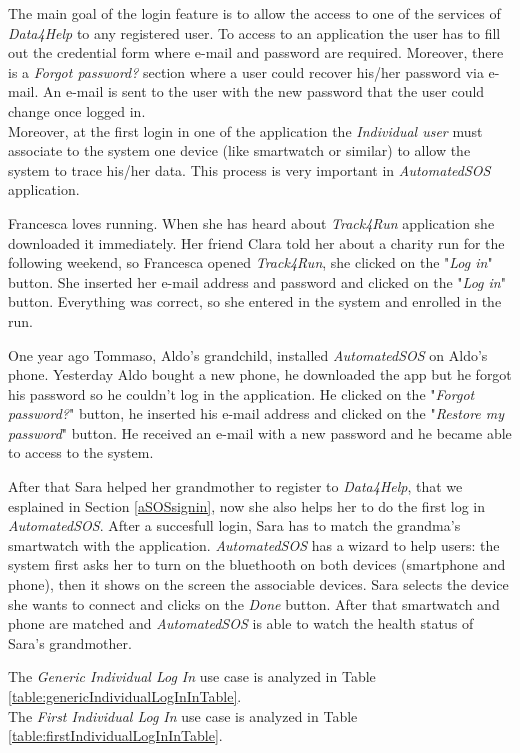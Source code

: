 The main goal of the login feature is to allow the access to one of the services of \textit{Data4Help} to any registered user. To access to an application the user has to fill out the credential form where e-mail and password are required. Moreover, there is a \textit{Forgot password?} section where a user could recover his/her password via e-mail. An e-mail is sent to the user with the new password that the user could change once logged in.\\
Moreover, at the first login in one of the application the \textit{Individual user} must associate to the system one device (like smartwatch or similar) to allow the system to trace his/her data. This process is very important in \textit{AutomatedSOS} application.

Francesca loves running. When she has heard about \textit{Track4Run} application she downloaded it immediately. Her friend Clara told her about a charity run for the following weekend, so Francesca opened \textit{Track4Run}, she clicked on the "\textit{Log in}" button. She inserted her e-mail address and password and clicked on the "\textit{Log in}" button. Everything was correct, so she entered in the system and enrolled in the run.

One year ago Tommaso, Aldo's grandchild, installed \textit{AutomatedSOS} on Aldo’s phone. Yesterday Aldo bought a new phone, he downloaded the app but he forgot his password so he couldn’t log in the application. He clicked on the "\textit{Forgot password?}" button, he inserted his e-mail address and clicked on the  "\textit{Restore my password}" button. He received an e-mail with a new password and he became able to access to the system.

After that Sara helped her grandmother to register to \textit{Data4Help}, that we esplained in Section \ref{aSOSsignin}, now she also helps her to do the first log in \textit{AutomatedSOS}. After a succesfull login, Sara has to match the grandma's smartwatch with the application. \textit{AutomatedSOS} has a wizard to help users: the system first asks her to turn on the bluethooth on both devices (smartphone and phone), then it shows on the screen the associable devices. Sara selects the device she wants to connect and clicks on the \textit{Done} button.
After that smartwatch and phone are matched and \textit{AutomatedSOS} is able to watch the health status of Sara's grandmother.

The \textit{Generic Individual Log In} use case is analyzed in Table \ref{table:genericIndividualLogInInTable}.\\
The \textit{First Individual Log In} use case is analyzed in Table \ref{table:firstIndividualLogInInTable}.

